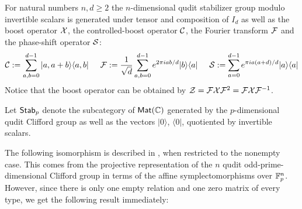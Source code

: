 \begin{lemma}
\label{lemma:end}
For natural numbers $n,d \geq 2$ the $n$-dimensional qudit stabilizer group modulo invertible scalars is generated under tensor and composition of $I_d$ as well as the boost operator ${\cal X}$, the controlled-boost operator  ${\cal C}$, the Fourier transform ${\cal F}$ and the phase-shift operator ${\cal S}$:
$$
{\cal C}  := \sum_{a,b = 0 }^{d-1} |a,a+b \rangle\langle a, b|
\hspace*{.5cm}
{\cal F}  := \frac{1}{\sqrt d}\sum_{a,b= 0 }^{d-1} e^{2\pi i ab/d} |b \rangle\langle a|
\hspace*{.5cm}
{\cal S} := \sum_{a =0}^{d-1} e^{\pi i a (a+d)/d} |  a  \rangle\langle a |
$$
Notice that the boost operator can be obtained by ${\cal Z }={\cal F}{\cal X} {\cal F}^{2}={\cal F}{\cal X} {\cal F}^{-1}$.
\end{lemma}



\begin{definition}
Let ${\sf Stab}_p$ denote the subcategory of $\mathsf{Mat}(\mathbb{C})$ generated by the $p$-dimensional qudit Clifford group as well as the vectors $| 0\rangle$, $\langle 0|$, quotiented by invertible scalars.
\end{definition}


The following isomorphism is described in \cite{gross}, when restricted to the nonempty case.  This comes from the projective representation of the $n$ qudit odd-prime-dimensional Clifford group in terms of the affine symplectomorphisms over $\mathbb{F}_p^n$.  However, since there is only one empty relation and one zero matrix of every type, we get the following result immediately:

